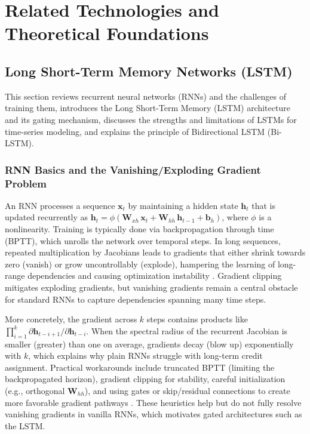 \chapter{Related Technologies and Theoretical Foundations}
\label{cha:related_technologies}

\section{Long Short-Term Memory Networks (LSTM)}
\label{sec:related_technologies:lstm}

This section reviews recurrent neural networks (RNNs) and the challenges of training them, introduces the Long Short-Term Memory (LSTM) architecture and its gating mechanism, discusses the strengths and limitations of LSTMs for time-series modeling, and explains the principle of Bidirectional LSTM (Bi-LSTM).

\subsection{RNN Basics and the Vanishing/Exploding Gradient Problem}
An RNN processes a sequence \(\mathbf{x}_t\) by maintaining a hidden state \(\mathbf{h}_t\) that is updated recurrently as \(\mathbf{h}_t = \phi(\mathbf{W}_{xh}\,\mathbf{x}_t + \mathbf{W}_{hh}\,\mathbf{h}_{t-1} + \mathbf{b}_h)\), where \(\phi\) is a nonlinearity. Training is typically done via backpropagation through time (BPTT), which unrolls the network over temporal steps. In long sequences, repeated multiplication by Jacobians leads to gradients that either shrink towards zero (vanish) or grow uncontrollably (explode), hampering the learning of long-range dependencies and causing optimization instability \cite{pascanu2013difficulty}. Gradient clipping mitigates exploding gradients, but vanishing gradients remain a central obstacle for standard RNNs to capture dependencies spanning many time steps.

More concretely, the gradient across \(k\) steps contains products like \(\prod_{i=1}^{k} \partial \mathbf{h}_{t-i+1}/\partial \mathbf{h}_{t-i}\). When the spectral radius of the recurrent Jacobian is smaller (greater) than one on average, gradients decay (blow up) exponentially with \(k\), which explains why plain RNNs struggle with long-term credit assignment. Practical workarounds include truncated BPTT (limiting the backpropagated horizon), gradient clipping for stability, careful initialization (e.g., orthogonal \(\mathbf{W}_{hh}\)), and using gates or skip/residual connections to create more favorable gradient pathways \cite{pascanu2013difficulty}. These heuristics help but do not fully resolve vanishing gradients in vanilla RNNs, which motivates gated architectures such as the LSTM.

